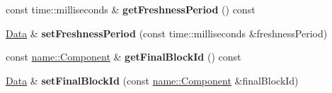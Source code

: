 \begin{DoxyCompactItemize}
\item 
const time\+::milliseconds \& {\bfseries get\+Freshness\+Period} () const\hypertarget{classndn_1_1Data_a9e34e6b95ca87d8d38e2d7d96244d419}{}\label{classndn_1_1Data_a9e34e6b95ca87d8d38e2d7d96244d419}

\item 
\hyperlink{classndn_1_1Data}{Data} \& {\bfseries set\+Freshness\+Period} (const time\+::milliseconds \&freshness\+Period)\hypertarget{classndn_1_1Data_ab6e99760d28caa0fdeed4d6ef429080b}{}\label{classndn_1_1Data_ab6e99760d28caa0fdeed4d6ef429080b}

\item 
const \hyperlink{classndn_1_1name_1_1Component}{name\+::\+Component} \& {\bfseries get\+Final\+Block\+Id} () const\hypertarget{classndn_1_1Data_a8a07ddd61216d195f30f6c499b336068}{}\label{classndn_1_1Data_a8a07ddd61216d195f30f6c499b336068}

\item 
\hyperlink{classndn_1_1Data}{Data} \& {\bfseries set\+Final\+Block\+Id} (const \hyperlink{classndn_1_1name_1_1Component}{name\+::\+Component} \&final\+Block\+Id)\hypertarget{classndn_1_1Data_ac6b89fe5c7108cecb6e42dd92a78307e}{}\label{classndn_1_1Data_ac6b89fe5c7108cecb6e42dd92a78307e}


\end{DoxyCompactItemize}
